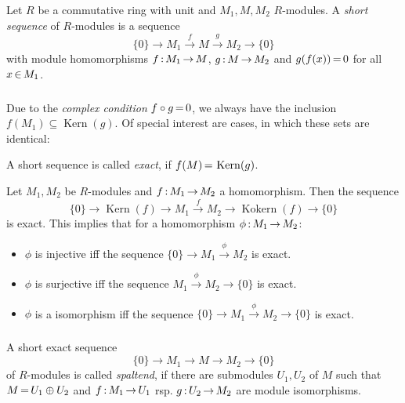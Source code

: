 \documentclass[11pt,twoside]{article}
\begin{document}
\begin{definition}
Let $R$ be a commutative ring with unit and $M_1,M,M_2$ $R$-modules.
A \textit{short sequence} of $R$-modules is a sequence
\[
       \{0\}
       \longrightarrow M_1
       \stackrel{f}{\longrightarrow} M
       \stackrel{g}{\longrightarrow} M_2
       \longrightarrow               \{0\}
\]
with module homomorphisms $f {\,:\,} M_1 {\,\to\,} M$, $g {\,:\,} M {\,\to\,} M_2$ and
$g(f(x)) {\,=\,} 0$ for all $x {\,\in\,} M_1$.
\end{definition}

\subparagraph{}
Due to the \textit{complex condition} $f \circ g {\,=\,} 0$,
we always have the inclusion $f(M_1) \subseteq \operatorname{Kern}(g)$.
Of special interest are cases, in which these sets are identical:

\begin{definition}
A short sequence is called \textit{exact}, if $f(M) {\,=\,} \operatorname{Kern}(g)$.
\end{definition}

\begin{example}
Let $M_1,M_2$ be $R$-modules and $f{\,:\,}M_1 {\,\to\,} M_2$ a homomorphism.
Then the sequence
\[
       \{0\}
       \longrightarrow              \operatorname{Kern}(f)
       \longrightarrow               M_1
       \stackrel{f}{\longrightarrow} M_2
       \longrightarrow              \operatorname{Kokern}(f)
       \longrightarrow              \{0\}
\]
is exact.
This implies that for a homomorphism $\phi {\,:\,}M_1 {\,\to\,} M_2$:

\begin{itemize}
\item
$\phi$ is injective  iff the sequence
$\{0\} \longrightarrow M_1 \stackrel{\phi}{\longrightarrow} M_2$ is exact.

\item
$\phi$ is surjective  iff the sequence
$M_1 \stackrel{\phi}{\longrightarrow} M_2 \longrightarrow \{0\}$ is exact.

\item
$\phi$ is a isomorphism iff the sequence
$\{0\} \longrightarrow M_1 \stackrel{\phi}{\longrightarrow} M_2 
       \longrightarrow \{0\}$
is exact.
\end{itemize}
\end{example}

\subparagraph{}
A short exact sequence
\[
\{0\} \longrightarrow M_1 \longrightarrow M 
      \longrightarrow M_2 \longrightarrow    \{0\}
\]
of $R$-modules is called \textit{spaltend},
if there are submodules $U_1,U_2$ of $M$
such that
$M {\,=\,} U_1 \oplus U_2$ and $f{\,:\,}M_1 {\,\to\,} U_1$ rsp. $g{\,:\,}U_2 {\,\to\,} M_2$ 
are module isomorphisms.
\end{document}
